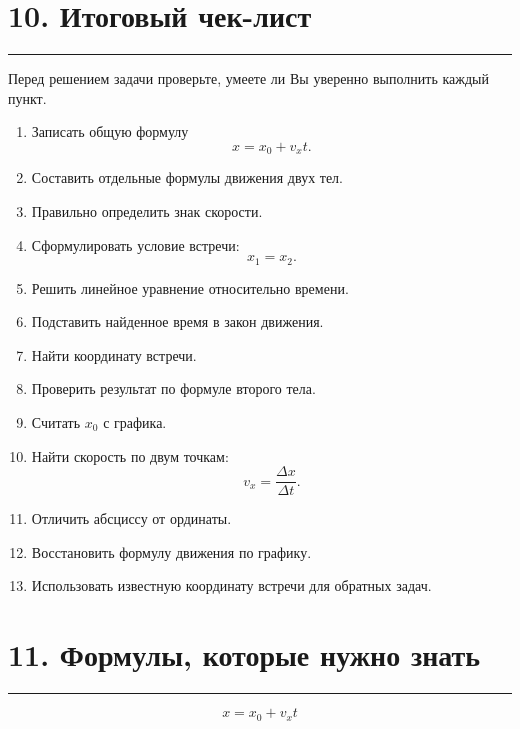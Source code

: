 \documentclass[a4paper,12pt]{article}
\newcommand{\sectionline}{%
    \vspace{-0.4em}
    {\color{accent}\rule{\linewidth}{0.7pt}}
    \vspace{0.4em}
}
\begin{document}
\section*{\color{darkaccent}10. Итоговый чек-лист}
\sectionline

Перед решением задачи проверьте, умеете ли Вы уверенно выполнить каждый пункт.

\begin{enumerate}[label=\(\square\)]
    \item Записать общую формулу
    \[
    x=x_0+v_xt.
    \]

    \item Составить отдельные формулы движения двух тел.

    \item Правильно определить знак скорости.

    \item Сформулировать условие встречи:
    \[
    x_1=x_2.
    \]

    \item Решить линейное уравнение относительно времени.

    \item Подставить найденное время в закон движения.

    \item Найти координату встречи.

    \item Проверить результат по формуле второго тела.

    \item Считать \(x_0\) с графика.

    \item Найти скорость по двум точкам:
    \[
    v_x=\frac{\Delta x}{\Delta t}.
    \]

    \item Отличить абсциссу от ординаты.

    \item Восстановить формулу движения по графику.

    \item Использовать известную координату встречи для обратных задач.
\end{enumerate}

\section*{\color{darkaccent}11. Формулы, которые нужно знать}
\sectionline

\[
\boxed{x=x_0+v_xt}
\]
\end{document}
